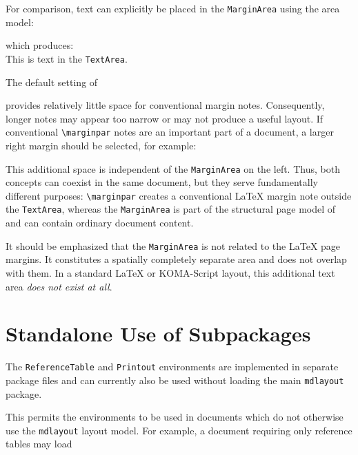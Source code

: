 \documentclass[
11pt,
a4paper,
oneside
]{scrbook}
\begin{document}
\noindent For comparison, text can explicitly be placed in the
\texttt{MarginArea} using the \MDWordmark area model:




which produces:\\[1ex]
{This is text in the \texttt{TextArea}.}

\noindent The default \MDWordmark setting of




provides relatively little space for conventional margin notes.
Consequently, longer notes may appear too narrow or may not produce
a useful layout. If conventional \texttt{\textbackslash{}marginpar} notes are
an important part of a document, a larger right margin should be
selected, for example:




This additional space is independent of the \MDWordmark
\texttt{MarginArea} on the left.
Thus, both concepts can coexist in the same document, but they serve
fundamentally different purposes: \texttt{\textbackslash{}marginpar} creates
a conventional \LaTeX{} margin note outside the \texttt{TextArea},
whereas the \texttt{MarginArea} is part of the structural page model
of \MDWordmark and can contain ordinary document content.

\begin{note}
	It should be emphasized that the \texttt{MarginArea} is not related to the
	\LaTeX{} page margins. It constitutes a spatially completely separate area
	and does not overlap with them. In a standard \LaTeX{} or KOMA-Script layout,
	this additional text area \emph{does not exist at all}.
\end{note}

\section{Standalone Use of Subpackages}
\label{sec:StandaloneSubpackages}

The \texttt{ReferenceTable} and \texttt{Printout} environments are implemented
in separate package files and can currently also be used without loading the
main \texttt{mdlayout} package.

This permits the environments to be used in documents which do not otherwise
use the \texttt{mdlayout} layout model. For example, a document requiring only
reference tables may load
\end{document}
